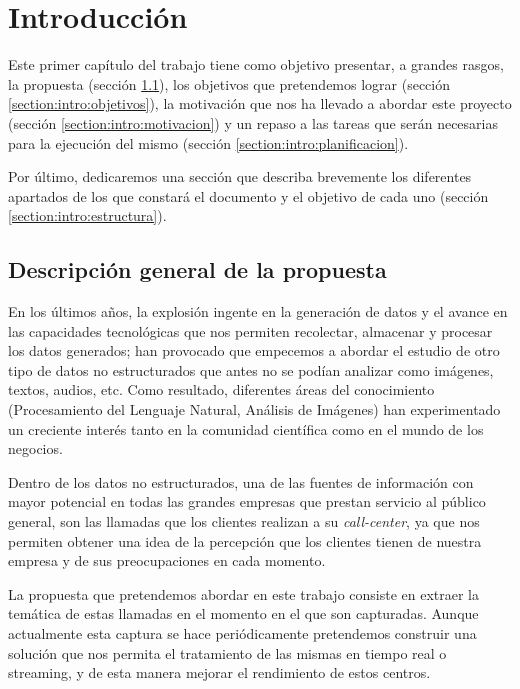 \chapter{Introducción}
\label{chapter:introduccion}

Este primer capítulo del trabajo tiene como objetivo presentar, a grandes rasgos, la propuesta (sección \ref{section:intro:descripcion}), los objetivos que pretendemos lograr (sección \ref{section:intro:objetivos}), la motivación que nos ha llevado a abordar este proyecto (sección \ref{section:intro:motivacion}) y un repaso a las tareas que serán necesarias para la ejecución del mismo (sección \ref{section:intro:planificacion}). 

Por último, dedicaremos una sección que describa brevemente los diferentes apartados de los que constará el documento y el objetivo de cada uno (sección \ref{section:intro:estructura}).

\section{Descripción general de la propuesta}
\label{section:intro:descripcion}
En los últimos años, la explosión ingente en la generación de datos y el avance en las capacidades tecnológicas que nos permiten recolectar, almacenar y procesar los datos generados; han provocado que empecemos a abordar el estudio de otro tipo de datos no estructurados que antes no se podían analizar como imágenes, textos, audios, etc. Como resultado, diferentes áreas del conocimiento (Procesamiento del Lenguaje Natural, Análisis de Imágenes) han experimentado un creciente interés tanto en la comunidad científica como en el mundo de los negocios. 


Dentro de los datos no estructurados, una de las fuentes de información con mayor potencial en todas las grandes empresas que prestan servicio al público general, son las llamadas que los clientes realizan a su \textit{call-center}, ya que nos permiten obtener una idea de la percepción que los clientes tienen de nuestra empresa y de sus preocupaciones en cada momento. 

La propuesta que pretendemos abordar en este trabajo consiste en extraer la temática de  estas llamadas en el momento en el que son capturadas. Aunque actualmente esta captura se hace periódicamente pretendemos construir una solución que nos permita el tratamiento de las mismas en tiempo real o streaming, y de esta manera mejorar el rendimiento de estos centros. %

